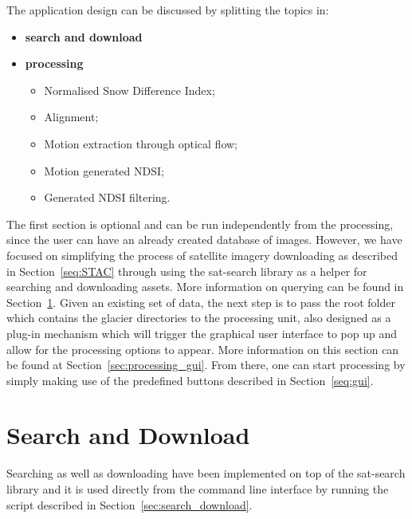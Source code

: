 \documentclass[12pt, a4paper]{report}
\begin{document}
	\par The application design can be discussed by splitting the topics in:
	
	\begin{itemize}
		\item \textbf{search and download}
		\item \textbf{processing}
		\begin{itemize}
			\item Normalised Snow Difference Index;
			\item Alignment;
			\item Motion extraction through optical flow;
			\item Motion generated NDSI;
			\item Generated NDSI filtering.
		\end{itemize}
	\end{itemize}

	\par The first section is optional and can be run independently from the processing, since the user can have an already created database of images. However, we have focused on simplifying the process of satellite imagery downloading as described in Section~\ref{seq:STAC} through using the sat-search library as a helper for searching and downloading assets. More information on querying can be found in Section~\ref{seq:sd_implementation}. 
	Given an existing set of data, the next step is to pass the root folder which contains the glacier directories to the processing unit, also designed as a plug-in mechanism which will trigger the graphical user interface to pop up and allow for the processing options to appear. More information on this section can be found at Section~\ref{sec:processing_gui}. From there, one can start processing by simply making use of the predefined buttons described in Section~\ref{seq:gui}.
	
		
	\section{Search and Download}
	\label{seq:sd_implementation}
		
	\par Searching as well as downloading have been implemented on top of the sat-search library and it is used directly from the command line interface by running the script described in Section~\ref{sec:search_download}.
	
\end{document}
